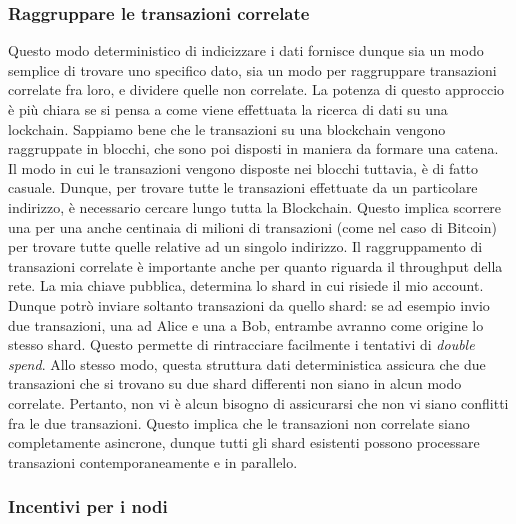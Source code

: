 \subsubsection{Raggruppare le transazioni correlate}

Questo modo deterministico di indicizzare i dati fornisce dunque sia un modo semplice di trovare uno specifico dato, sia un modo per raggruppare transazioni correlate fra loro, e dividere quelle non correlate. La potenza di questo approccio è più chiara se si pensa a come viene effettuata la ricerca di dati su una lockchain. 
Sappiamo bene che le transazioni su una blockchain vengono raggruppate in blocchi, che sono poi disposti in maniera da formare una catena. Il modo in cui le transazioni vengono disposte nei blocchi tuttavia, è di fatto casuale. Dunque, per trovare tutte le transazioni effettuate da un particolare indirizzo, è necessario cercare lungo tutta la Blockchain. Questo implica scorrere una per una anche centinaia di milioni di transazioni (come nel caso di Bitcoin) per trovare tutte quelle relative ad un singolo indirizzo.
Il raggruppamento di transazioni correlate è importante anche per quanto riguarda il throughput della rete. La mia chiave pubblica, determina lo shard in cui risiede il mio account. Dunque potrò inviare soltanto transazioni da quello shard: se ad esempio invio due transazioni, una ad Alice e una a Bob, entrambe avranno come origine lo stesso shard. Questo permette di rintracciare facilmente i tentativi di \textit{double spend}. 
Allo stesso modo, questa struttura dati deterministica assicura che due transazioni che si trovano su due shard differenti non siano in alcun modo correlate. Pertanto, non vi è alcun bisogno di assicurarsi che non vi siano conflitti fra le due transazioni. Questo implica che le transazioni non correlate siano completamente asincrone, dunque tutti gli shard esistenti possono processare transazioni contemporaneamente e in parallelo.

\subsubsection{Incentivi per i nodi}

